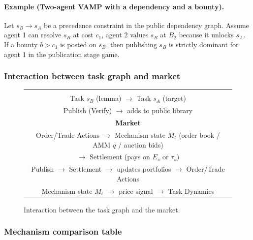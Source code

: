 \paragraph{Example (Two-agent VAMP with a dependency and a bounty).}
Let \(s_B\to s_A\) be a precedence constraint in the public dependency graph. Assume agent 1 can resolve \(s_B\) at cost \(c_1\), agent 2 values \(s_B\) at \(B_2\) because it unlocks \(s_A\). If a bounty \(b>c_1\) is posted on \(s_B\), then publishing \(s_B\) is strictly dominant for agent 1 in the publication stage game.

\subsubsection{Interaction between task graph and market}

\begin{figure}[t]
\centering
\begin{tabular}{c}
\fbox{\begin{minipage}{0.85\textwidth}
\centering
\textbf{Task Dynamics}\\[4pt]
Task \(s_B\) (lemma) \(\rightarrow\) Task \(s_A\) (target)\\
Publish (Verify) \(\rightarrow\) adds to public library\\[10pt]
\textbf{Market}\\[4pt]
Order/Trade Actions \(\rightarrow\) Mechanism state \(M_t\) (order book / AMM \(q\) / auction bids)\\
\(\rightarrow\) Settlement (pays on \(E_s\) or \(\tau_s\))\\[10pt]
Publish \(\rightarrow\) Settlement \(\rightarrow\) updates portfolios \(\rightarrow\) Order/Trade Actions\\
Mechanism state \(M_t\) \(\rightarrow\) price signal \(\rightarrow\) Task Dynamics
\end{minipage}}
\end{tabular}
\caption{Interaction between the task graph and the market.}
\label{fig:vamp-task-market}
\end{figure}

\subsubsection{Mechanism comparison table}

